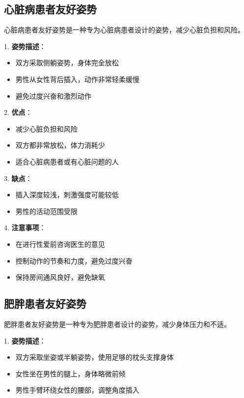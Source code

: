 \documentclass[12pt,UTF8]{ctexbook}
\begin{document}
\subsection{心脏病患者友好姿势}

心脏病患者友好姿势是一种专为心脏病患者设计的姿势，减少心脏负担和风险。

1. \textbf{姿势描述}：
  \begin{itemize}
  \item 双方采取侧躺姿势，身体完全放松
  \item 男性从女性背后插入，动作非常轻柔缓慢
  \item 避免过度兴奋和激烈动作
  \end{itemize}

2. \textbf{优点}：
  \begin{itemize}
  \item 减少心脏负担和风险
  \item 双方都非常放松，体力消耗少
  \item 适合心脏病患者或有心脏问题的人
  \end{itemize}

3. \textbf{缺点}：
  \begin{itemize}
  \item 插入深度较浅，刺激强度可能较低
  \item 男性的活动范围受限
  \end{itemize}

4. \textbf{注意事项}：
  \begin{itemize}
  \item 在进行性爱前咨询医生的意见
  \item 控制动作的节奏和力度，避免过度兴奋
  \item 保持房间通风良好，避免缺氧
  \end{itemize}

\subsection{肥胖患者友好姿势}

肥胖患者友好姿势是一种专为肥胖患者设计的姿势，减少身体压力和不适。

1. \textbf{姿势描述}：
  \begin{itemize}
  \item 双方采取坐姿或半躺姿势，使用足够的枕头支撑身体
  \item 女性坐在男性的腿上，身体略微前倾
  \item 男性手臂环绕女性的腰部，调整角度插入
  \end{itemize}
\end{document}
